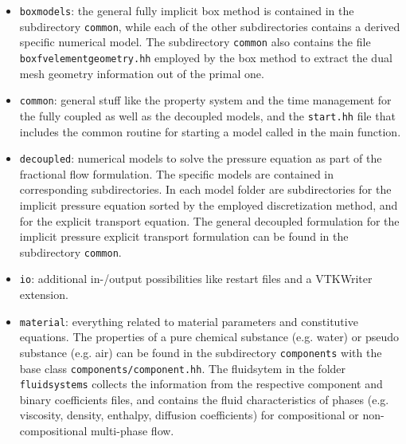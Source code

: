 \begin{itemize} 

\item \texttt{boxmodels}:
the general fully implicit box method is contained in the subdirectory 
\texttt{common}, while each of the other subdirectories contains 
a derived specific numerical model. The subdirectory \texttt{common} also contains the file \texttt{boxfvelementgeometry.hh} employed by the box method to extract the dual mesh geometry information out of the primal one. 

\item \texttt{common}:
general stuff like the property system and the time management for the 
fully coupled as well as the decoupled models, 
and the \texttt{start.hh} file that includes the common routine for starting a model called in the main function. 

\item \texttt{decoupled}:
 numerical models to solve the pressure equation as part of the fractional flow formulation. The specific models are contained 
 in corresponding subdirectories. In each model folder are subdirectories for the implicit pressure equation sorted by the employed discretization method, and for the explicit transport equation. The general decoupled formulation for the implicit pressure explicit transport formulation can be found in the subdirectory \texttt{common}.




\item \texttt{io}: additional in-/output possibilities like restart files 
and a VTKWriter extension. 

\item \texttt{material}: everything related to material parameters and 
constitutive equations. The properties of a pure chemical substance (e.g. water) or pseudo substance (e.g. air) can be found in the subdirectory \texttt{components} with the base class \texttt{components/component.hh}. The fluidsytem in the folder \texttt{fluidsystems} collects the information from the respective component and binary coefficients files, and contains the fluid characteristics of phases (e.g. viscosity, density, enthalpy, diffusion coefficients) for compositional or non-compositional multi-phase flow. 


\end{itemize}
